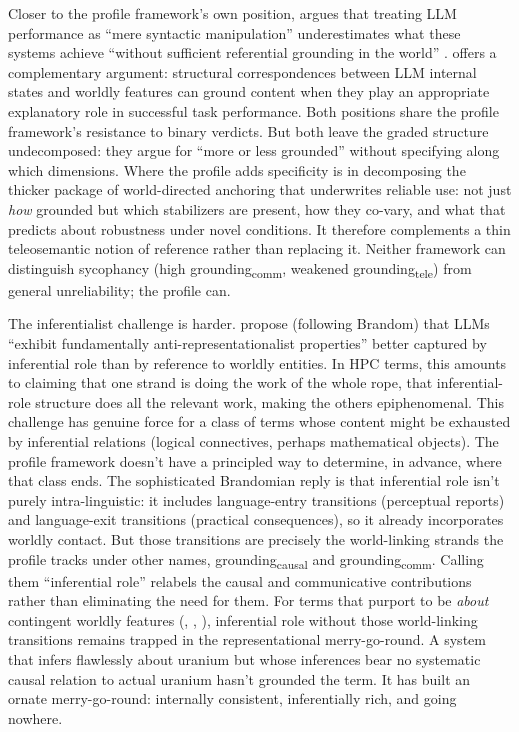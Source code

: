 \documentclass[12pt]{article}
\newcommand{\gtele}{grounding\textsubscript{tele}}
\newcommand{\gcausal}{grounding\textsubscript{causal}}
\newcommand{\gcomm}{grounding\textsubscript{comm}}
\begin{document}
Closer to the profile framework's own position, \textcite{havlik_2023_meaning_understanding_llms} argues that treating LLM performance as \enquote{mere syntactic manipulation} underestimates what these systems achieve \enquote{without sufficient referential grounding in the world} \citep[1]{havlik_2023_meaning_understanding_llms}. \textcite{williams_forthcoming_structural_correspondences_llms} offers a complementary argument: structural correspondences between LLM internal states and worldly features can ground content when they play an appropriate explanatory role in successful task performance. Both positions share the profile framework's resistance to binary verdicts. But both leave the graded structure undecomposed: they argue for \enquote{more or less grounded} without specifying along which dimensions. Where the profile adds specificity is in decomposing the thicker package of world-directed anchoring that underwrites reliable use: not just \emph{how} grounded but which stabilizers are present, how they co-vary, and what that predicts about robustness under novel conditions. It therefore complements a thin teleosemantic notion of reference rather than replacing it. Neither framework can distinguish sycophancy (high \gcomm{}, weakened \gtele{}) from general unreliability; the profile can.

The inferentialist challenge is harder. \textcite{arai_tsugawa_2024_inferentialist_semantics_llms} propose (following Brandom) that LLMs \enquote{exhibit fundamentally anti-representationalist properties} \citep[1]{arai_tsugawa_2024_inferentialist_semantics_llms} better captured by inferential role than by reference to worldly entities. In HPC terms, this amounts to claiming that one strand is doing the work of the whole rope, that inferential-role structure does all the relevant work, making the others epiphenomenal. This challenge has genuine force for a class of terms whose content might be exhausted by inferential relations (logical connectives, perhaps mathematical objects). The profile framework doesn't have a principled way to determine, in advance, where that class ends. The sophisticated Brandomian reply is that inferential role isn't purely intra-linguistic: it includes language-entry transitions (perceptual reports) and language-exit transitions (practical consequences), so it already incorporates worldly contact. But those transitions are precisely the world-linking strands the profile tracks under other names, \gcausal{} and \gcomm{}. Calling them \enquote{inferential role} relabels the causal and communicative contributions rather than eliminating the need for them. For terms that purport to be \emph{about} contingent worldly features (, , ), inferential role without those world-linking transitions remains trapped in the representational merry-go-round. A system that infers flawlessly about uranium but whose inferences bear no systematic causal relation to actual uranium hasn't grounded the term. It has built an ornate merry-go-round: internally consistent, inferentially rich, and going nowhere.
\end{document}
